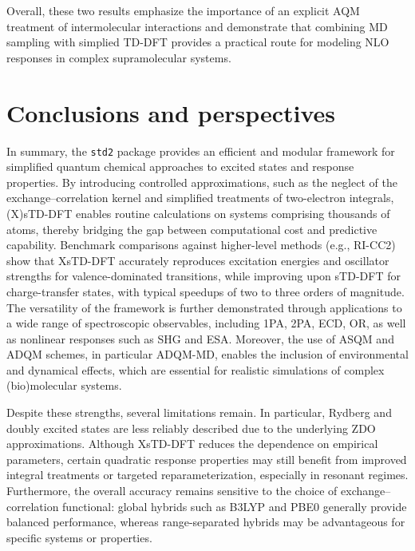 \documentclass[%
 aip,
 amsmath,amssymb,
preprint,%
]{revtex4-2}
\begin{document}
Overall, these two results emphasize the importance of an explicit AQM treatment of intermolecular interactions and demonstrate that combining MD sampling with simplied TD-DFT provides a practical route for modeling NLO responses in complex supramolecular systems.

\clearpage
\section{Conclusions and perspectives}

In summary, the \texttt{std2} package provides an efficient and modular framework for simplified quantum chemical approaches to excited states and response properties.  
By introducing controlled approximations, such as the neglect of the exchange--correlation kernel and simplified treatments of two-electron integrals, (X)sTD-DFT enables routine calculations on systems comprising thousands of atoms, thereby bridging the gap between computational cost and predictive capability.  
Benchmark comparisons against higher-level methods (e.g., RI-CC2) show that XsTD-DFT accurately reproduces excitation energies and oscillator strengths for valence-dominated transitions, while improving upon sTD-DFT for charge-transfer states, with typical speedups of two to three orders of magnitude.  
The versatility of the framework is further demonstrated through applications to a wide range of spectroscopic observables, including 1PA, 2PA, ECD, OR, as well as nonlinear responses such as SHG and ESA.  
Moreover, the use of ASQM and ADQM schemes, in particular ADQM-MD, enables the inclusion of environmental and dynamical effects, which are essential for realistic simulations of complex (bio)molecular systems.

Despite these strengths, several limitations remain.  
In particular, Rydberg and doubly excited states are less reliably described due to the underlying ZDO approximations.  
Although XsTD-DFT reduces the dependence on empirical parameters, certain quadratic response properties may still benefit from improved integral treatments or targeted reparameterization, especially in resonant regimes.  
Furthermore, the overall accuracy remains sensitive to the choice of exchange--correlation functional: global hybrids such as B3LYP and PBE0 generally provide balanced performance, whereas range-separated hybrids may be advantageous for specific systems or properties.
\end{document}
